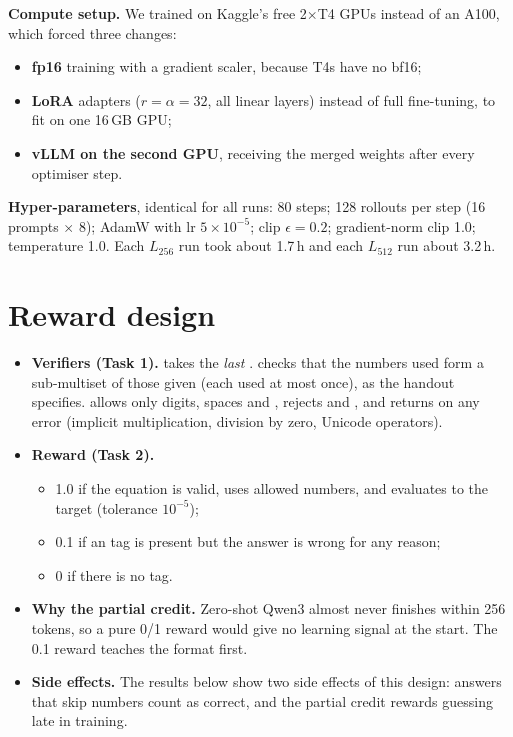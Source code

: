 \documentclass[10.5pt]{article}
\begin{document}
\textbf{Compute setup.} We trained on Kaggle's free 2$\times$T4 GPUs instead of an A100, which forced three changes:
\begin{itemize}
\item \textbf{fp16} training with a gradient scaler, because T4s have no bf16;
\item \textbf{LoRA} adapters ($r=\alpha=32$, all linear layers) instead of full fine-tuning, to fit on one 16\,GB GPU;
\item \textbf{vLLM on the second GPU}, receiving the merged weights after every optimiser step.
\end{itemize}
\textbf{Hyper-parameters}, identical for all runs: 80 steps; 128 rollouts per step (16 prompts $\times$ 8); AdamW with lr
$5\times10^{-5}$; clip $\epsilon=0.2$; gradient-norm clip 1.0; temperature 1.0. Each $L_{256}$ run took about 1.7\,h and
each $L_{512}$ run about 3.2\,h.

\section{Reward design}
\begin{itemize}
\item \textbf{Verifiers (Task 1).}  takes the \emph{last} .
   checks that the numbers used form a sub-multiset of those given (each used at most once), as
  the handout specifies.  allows only digits, spaces and \code{+ - * / ( )}, rejects
  \code{**} and \code{//}, and returns  on any error (implicit multiplication, division by zero, Unicode
  operators).
\item \textbf{Reward (Task 2).}
  \begin{itemize}
  \item 1.0 if the equation is valid, uses allowed numbers, and evaluates to the target (tolerance $10^{-5}$);
  \item 0.1 if an  tag is present but the answer is wrong for any reason;
  \item 0 if there is no tag.
  \end{itemize}
\item \textbf{Why the partial credit.} Zero-shot Qwen3 almost never finishes within 256 tokens, so a pure 0/1 reward
  would give no learning signal at the start. The 0.1 reward teaches the format first.
\item \textbf{Side effects.} The results below show two side effects of this design: answers that skip numbers count as
  correct, and the partial credit rewards guessing late in training.
\end{itemize}
\end{document}
